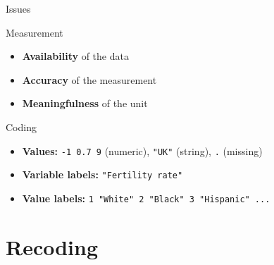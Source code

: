 \documentclass[t]{beamer}
\begin{document}
	\begin{frame}[t]{Issues}

	   \begin{block}{Measurement}
     
	     \begin{itemize}
				 \item \textbf{Availability} of the data
		     \item \textbf{Accuracy} of the measurement
		     \item \textbf{Meaningfulness} of the unit
	     \end{itemize}
	     

	   \end{block}
		 
     \begin{block}{Coding}

        \begin{itemize}
          \item \textbf{Values:} \texttt{-1 0.7 9} (numeric), \texttt{"UK"} (string), \texttt{.} (missing)
      		\item \textbf{Variable labels:} \texttt{"Fertility rate"}
      		\item \textbf{Value labels:} \texttt{1 "White" 2 "Black" 3 "Hispanic" ...}
        \end{itemize}
     
     \end{block}
		
	\end{frame}

	\section{Recoding}
  
\end{document}
